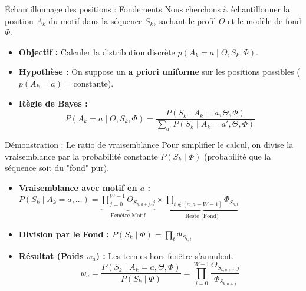 \documentclass[10pt]{beamer}
\begin{document}
\begin{frame}{Échantillonnage des positions : Fondements}
    Nous cherchons à échantillonner la position $A_k$ du motif dans la séquence $S_k$, sachant le profil $\Theta$ et le modèle de fond $\Phi$.
    \vspace{0.3cm}
    \begin{itemize}
        \item \textbf{Objectif :} Calculer la distribution discrète $p(A_k = a \mid \Theta, S_k, \Phi)$.
        \item \textbf{Hypothèse :} On suppose un \textbf{a priori uniforme} sur les positions possibles ($p(A_k=a) = \text{constante}$).
        \item \textbf{Règle de Bayes :} 
        \begin{equation}
            P(A_k = a \mid \Theta, S_k, \Phi) = \frac{P(S_k \mid A_k = a, \Theta, \Phi)}{\sum_{a'} P(S_k \mid A_k = a', \Theta, \Phi)}
        \end{equation}
    \end{itemize}
\end{frame}

\begin{frame}{Démonstration : Le ratio de vraisemblance}
    Pour simplifier le calcul, on divise la vraisemblance par la probabilité constante $P(S_k \mid \Phi)$ (probabilité que la séquence soit du "fond" pur).
    \begin{itemize}
        \item \textbf{Vraisemblance avec motif en $a$ :}
        $P(S_k \mid A_k=a, \dots) = \underbrace{\prod_{j=0}^{W-1} \Theta_{S_{k,a+j}, j}}_{\text{Fenêtre Motif}} \times \underbrace{\prod_{t \notin [a, a+W-1]} \Phi_{S_{k,t}}}_{\text{Reste (Fond)}}$
        \item \textbf{Division par le Fond :} $P(S_k \mid \Phi) = \prod_{t} \Phi_{S_{k,t}}$
        \item \textbf{Résultat (Poids $w_a$) :} Les termes hors-fenêtre s'annulent.
        \begin{equation}
            w_a = \frac{P(S_k \mid A_k = a, \Theta, \Phi)}{P(S_k \mid \Phi)} = \prod_{j=0}^{W-1} \frac{\Theta_{S_{k, a+j}, j}}{\Phi_{S_{k, a+j}}}
        \end{equation}
    \end{itemize}
\end{frame}
\end{document}
